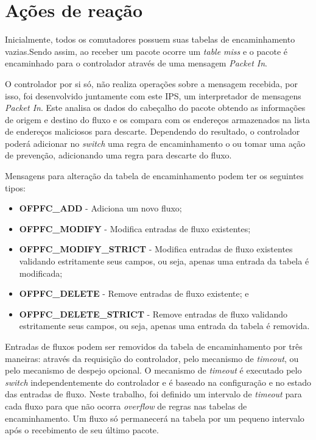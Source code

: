 \section{Ações de reação}
\label{sec:reacao}

Inicialmente, todos os comutadores possuem suas tabelas de encaminhamento vazias.Sendo assim, ao receber um pacote ocorre um \textit{table miss} e o pacote é encaminhado para o controlador através de uma mensagem \textit{Packet In}.

O controlador por si só, não realiza operações sobre a mensagem recebida, por isso, foi desenvolvido juntamente com este IPS, um interpretador de mensagens \textit{Packet In}. Este analisa os dados do cabeçalho do pacote obtendo as informações de origem e destino do fluxo e os compara com os endereços armazenados na lista de endereços maliciosos para descarte. Dependendo do resultado, o controlador poderá adicionar no \textit{switch} uma regra de encaminhamento o ou tomar uma ação de prevenção, adicionando uma regra para descarte do fluxo.

Mensagens para alteração da tabela de encaminhamento podem ter os seguintes tipos:
\begin{itemize}
    \item \textbf{OFPFC\_ADD} - Adiciona um novo fluxo;
    \item \textbf{OFPFC\_MODIFY} - Modifica entradas de fluxo existentes;
    \item \textbf{OFPFC\_MODIFY\_STRICT} - Modifica entradas de fluxo existentes validando estritamente seus campos, ou seja, apenas uma entrada da tabela é modificada;
    \item \textbf{OFPFC\_DELETE} - Remove entradas de fluxo existente; e
    \item \textbf{OFPFC\_DELETE\_STRICT} - Remove entradas de fluxo validando estritamente seus campos, ou seja, apenas uma entrada da tabela é removida.
\end{itemize}

Entradas de fluxos podem ser removidos da tabela de encaminhamento por três maneiras: através da requisição do controlador, pelo mecanismo de \textit{timeout}, ou pelo mecanismo de despejo opcional. O mecanismo de \textit{timeout} é executado pelo \textit{switch} independentemente do controlador e é baseado na configuração e no estado das entradas de fluxo. Neste trabalho, foi definido um intervalo de \textit{timeout} para cada fluxo para que não ocorra \textit{overflow} de regras nas tabelas de encaminhamento. Um fluxo só permanecerá na tabela por um pequeno intervalo após o recebimento de seu último pacote.

